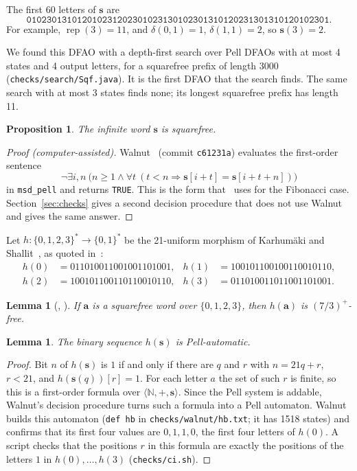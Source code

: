 \documentclass[11pt]{article}
\newtheorem{lemma}[theorem]{Lemma}
\newtheorem{proposition}[theorem]{Proposition}
\theoremstyle{definition}
\theoremstyle{remark}
\newcommand{\PSQ}{\mathbf{s}}
\begin{document}
The first 60 letters of $\PSQ$ are
\[
\texttt{010230131012010231202301023130102301310120231301310120102301}.
\]
For example, $\operatorname{rep}(3) = 11$, and $\delta(0,1) = 1$, $\delta(1,1) = 2$, so $\PSQ(3) = 2$.

We found this DFAO with a depth-first search over Pell DFAOs with at most 4 states and 4 output letters, for a squarefree prefix of length 3000 (\texttt{checks/search/Sqf.java}). It is the first DFAO that the search finds. The same search with at most 3 states finds none; its longest squarefree prefix has length 11.

\begin{proposition}\label{prop:sqf}
The infinite word $\PSQ$ is squarefree.
\end{proposition}

\begin{proof}[Proof (computer-assisted)]
Walnut~\cite{Mousavi,Walnut} (commit \texttt{c61231a}) evaluates the first-order sentence
\[
\neg \exists i, n\ \bigl(n \ge 1 \wedge \forall t\ (t < n \Rightarrow \PSQ[i+t] = \PSQ[i+t+n])\bigr)
\]
in \texttt{msd\_pell} and returns \texttt{TRUE}. This is the form that~\cite[proof of Theorem~11]{ARS} uses for the Fibonacci case. Section~\ref{sec:checks} gives a second decision procedure that does not use Walnut and gives the same answer.
\end{proof}

Let $h : \{0,1,2,3\}^* \to \{0,1\}^*$ be the 21-uniform morphism of Karhum\"aki and Shallit~\cite[Section~5]{KS}, as quoted in~\cite[Lemma~5]{ARS}:
\begin{align*}
h(0) &= 011010011001001101001, & h(1) &= 100101100100110010110,\\
h(2) &= 100101100110110010110, & h(3) &= 011010011011001101001.
\end{align*}

\begin{lemma}[{\cite[Lemma~8]{KS}, \cite[Lemma~5]{ARS}}]\label{lem:ks}
If $\mathbf{a}$ is a squarefree word over $\{0,1,2,3\}$, then $h(\mathbf{a})$ is $(7/3)^+$-free.
\end{lemma}

\begin{lemma}\label{lem:hpell}
The binary sequence $h(\PSQ)$ is Pell-automatic.
\end{lemma}

\begin{proof}
Bit $n$ of $h(\PSQ)$ is $1$ if and only if there are $q$ and $r$ with $n = 21q + r$, $r < 21$, and $h(\PSQ(q))[r] = 1$. For each letter $a$ the set of such $r$ is finite, so this is a first-order formula over $\langle \mathbb{N}, +, \PSQ \rangle$. Since the Pell system is addable, Walnut's decision procedure turns such a formula into a Pell automaton. Walnut builds this automaton (\texttt{def hb} in \texttt{checks/walnut/hb.txt}; it has 1518 states) and confirms that its first four values are $0,1,1,0$, the first four letters of $h(0)$. A script checks that the positions $r$ in this formula are exactly the positions of the letters $1$ in $h(0), \dots, h(3)$ (\texttt{checks/ci.sh}).
\end{proof}
\end{document}
